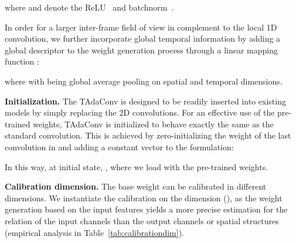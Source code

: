 \documentclass{article} \usepackage{iclr2022_conference,times}
\begin{document}
\noindent where  and  denote the ReLU~\citep{relu} and batchnorm~\citep{bn}. 

In order for a larger inter-frame field of view in complement to the local 1D convolution, we further incorporate global temporal information by adding a global descriptor  to the weight generation process  through a linear mapping function :

\noindent where  with  being global average pooling on spatial and temporal dimensions.


\textbf{Initialization. }The TAdaConv is designed to be readily inserted into existing models by simply replacing the 2D convolutions. 
For an effective use of the pre-trained weights, TAdaConv is initialized to behave exactly the same as the standard convolution.
This is achieved by zero-initializing the weight of the last convolution in  and adding a constant vector  to the formulation:

\noindent In this way, at initial state, , where we load  with the pre-trained weights.

\textbf{Calibration dimension. }
The base weight  can be calibrated in different dimensions.
We instantiate the calibration on the  dimension (), as the weight generation based on the input features yields a more precise estimation for the relation of the input channels than the output channels or spatial structures (empirical analysis in Table~\ref{tab:calibrationdim}). 
\end{document}
